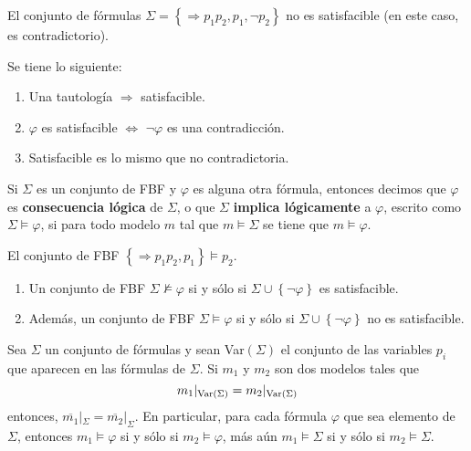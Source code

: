 \documentclass[12pt]{report}
\theoremstyle{largebreak}
\begin{document}
    \begin{exa}
        El conjunto de fórmulas $\Sigma=\left\{\Rightarrow p_1p_2, p_1,\neg p_2 \right\}$ no es satisfacible (en este caso, es contradictorio).
    \end{exa}

    \begin{obs}
        Se tiene lo siguiente:
        \begin{enumerate}
            \item Una tautología $\Rightarrow$ satisfacible.
            \item $\varphi$ es satisfacible $\iff$ $\neg\varphi$ es una contradicción.
            \item Satisfacible es lo mismo que no contradictoria.
        \end{enumerate}
    \end{obs}

    \begin{mydef}
        Si $\Sigma$ es un conjunto de FBF y $\varphi$ es alguna otra fórmula, entonces decimos que $\varphi$ es \textbf{consecuencia lógica} de $\Sigma$, o que $\Sigma$ \textbf{implica lógicamente} a $\varphi$, escrito como $\Sigma\vDash\varphi$, si para todo modelo $m$ tal que $m\vDash\Sigma$ se tiene que $m\vDash\varphi$.
    \end{mydef}

    \begin{exa}
        El conjunto  de FBF $\left\{\Rightarrow p_1 p_2, p_1\right\}\vDash p_2$.
    \end{exa}

    \begin{obs}
        \begin{enumerate}
            Se tiene lo siguiente:
            \item Un conjunto de FBF $\Sigma\nvDash\varphi$ si y sólo si $\Sigma\cup\left\{\neg\varphi \right\}$ es satisfacible.
            \item Además, un conjunto de FBF $\Sigma\vDash\varphi$ si y sólo si $\Sigma\cup\left\{\neg\varphi \right\}$ no es satisfacible.
        \end{enumerate}
    \end{obs}

    \begin{lema}
        Sea $\Sigma$ un conjunto de fórmulas y sean Var$(\Sigma)$ el conjunto de las variables $p_i$ que aparecen en las fórmulas de $\Sigma$. Si $m_1$ y $m_2$ son dos modelos tales que
        \begin{equation*}
            m_1|_{\textup{Var}(\Sigma)}=m_2|_{\textup{Var}(\Sigma)}
        \end{equation*}
        entonces, $\overline{m_1}|_{\Sigma}=\overline{m_2}|_{\Sigma}$. En particular, para cada fórmula $\varphi$ que sea elemento de $\Sigma$, entonces $m_1\vDash\varphi$ si y sólo si $m_2\vDash\varphi$, más aún $m_1\vDash\Sigma$ si y sólo si $m_2\vDash\Sigma$.
    \end{lema}
\end{document}
